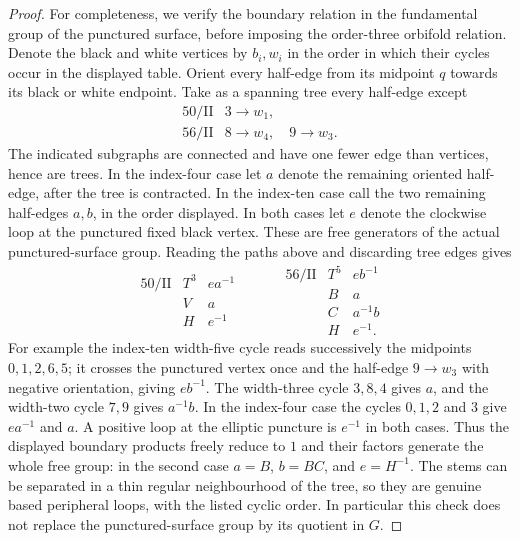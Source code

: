 \begin{proof}
For completeness, we verify the boundary relation in the fundamental
group of the punctured surface, before imposing the order-three
orbifold relation.  Denote the black and white vertices by $b_i,w_i$
in the order in which their cycles occur in the displayed table.
Orient every half-edge from its midpoint $q$ towards its black or
white endpoint.  Take as a spanning tree every half-edge except
\[
\begin{array}{c|l}
50/\mathrm{II}&3\longrightarrow w_1,\\
56/\mathrm{II}&8\longrightarrow w_4,\quad9\longrightarrow w_3.
\end{array}
\]
The indicated subgraphs are connected and have one fewer edge than
vertices, hence are trees.  In the index-four case let $a$ denote
the remaining oriented half-edge, after the tree is contracted.
In the index-ten case call the two remaining half-edges $a,b$, in
the order displayed.  In both cases let $e$ denote the clockwise
loop at the punctured fixed black vertex.  These are free generators
of the actual punctured-surface group.  Reading the paths above and
discarding tree edges gives
\begin{equation}\label{mapsD:repair:free-peripherals}
\begin{array}{c|ccc}
50/\mathrm{II}&T^3&e a^{-1}&\\[-3pt]
&V&a&\\[-3pt]
&H&e^{-1}&
\end{array}
\qquad
\begin{array}{c|cc}
56/\mathrm{II}&T^5&e b^{-1}\\
&B&a\\
&C&a^{-1}b\\
&H&e^{-1}.
\end{array}
\end{equation}
For example the index-ten width-five cycle reads successively the
midpoints $0,1,2,6,5$; it crosses the punctured vertex once and the
half-edge $9\to w_3$ with negative orientation, giving $eb^{-1}$.
The width-three cycle $3,8,4$ gives $a$, and the width-two cycle
$7,9$ gives $a^{-1}b$.  In the index-four case the cycles $0,1,2$
and $3$ give $ea^{-1}$ and $a$.  A positive loop at the elliptic
puncture is $e^{-1}$ in both cases.  Thus the displayed boundary
products freely reduce to $1$ and their factors generate the whole
free group: in the second case $a=B$, $b=BC$, and $e=H^{-1}$.
The stems can be separated in a thin regular neighbourhood of the
tree, so they are genuine based peripheral loops, with the listed
cyclic order.  In particular this check does not replace the
punctured-surface group by its quotient in $G$.


\end{proof}
